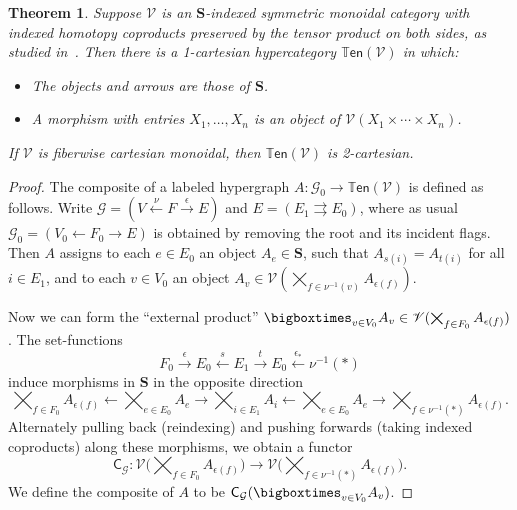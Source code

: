 \documentclass{article}
\newtheorem{thm}{Theorem}[section]
\theoremstyle{definition}
\theoremstyle{remark}
\def\G{\mathcal{G}}
\def\V{\mathscr{V}}
\def\ten{\mathbb{T}\mathsf{en}}
\let\ot\leftarrow
\let\xto\xrightarrow
\let\xot\xleftarrow
\def\bS{\ensuremath{\mathbf{S}}\xspace}
\begin{document}
\begin{thm}
  Suppose $\V$ is an \bS-indexed symmetric monoidal category with indexed homotopy coproducts preserved by the tensor product on both sides, as studied in~\cite{shulman:frbi,ps:indexed}.
  Then there is a 1-cartesian hypercategory $\ten(\V)$ in which:
  \begin{itemize}
  \item The objects and arrows are those of \bS.
  \item A morphism with entries $X_1,\dots,X_n$ is an object of $\V(X_1\times\cdots\times X_n)$.
  \end{itemize}
  If $\V$ is fiberwise cartesian monoidal, then $\ten(\V)$ is 2-cartesian.
\end{thm}
\begin{proof}
  The composite of a labeled hypergraph $A:\G_0\to\ten(\V)$ is defined as follows.
  Write $\G= (V\xot{\nu} F\xto{\epsilon} E)$ and $E = (E_1 \rightrightarrows E_0)$, where as usual $\G_0 = (V_0 \ot F_0 \to E)$ is obtained by removing the root and its incident flags.
  Then $A$ assigns to each $e\in E_0$ an object $A_e\in \bS$, such that $A_{s(i)}=A_{t(i)}$ for all $i\in E_1$, and to each $v\in V_0$ an object $A_v \in \V(\bigtimes_{f\in \nu^{-1}(v)} A_{\epsilon(f)})$.

  Now we can form the ``external product'' $\bigboxtimes_{v\in V_0} A_v \in \V(\bigtimes_{f\in F_0} A_{\epsilon(f)})$.
  The set-functions
  \[ F_0 \xto{\epsilon} E_0 \xot{s} E_1 \xto{t} E_0 \xot{\epsilon_\ast} \nu^{-1}(\ast) \]
  induce morphisms in \bS in the opposite direction
  \[ \bigtimes_{f\in F_0} A_{\epsilon(f)} \ot \bigtimes_{e\in E_0} A_e \to \bigtimes_{i\in E_1} A_{i} \ot \bigtimes_{e\in E_0} A_e \to \bigtimes_{f\in \nu^{-1}(\ast)} A_{\epsilon(f)}. \]
  Alternately pulling back (reindexing) and pushing forwards (taking indexed coproducts) along these morphisms, we obtain a functor
  \[ \mathsf{C}_\G : \V\Big(\bigtimes_{f\in F_0} A_{\epsilon(f)}\Big) \to \V\Big(\bigtimes_{f\in \nu^{-1}(\ast)} A_{\epsilon(f)}\Big). \]
  We define the composite of $A$ to be $\mathsf{C}_\G(\bigboxtimes_{v\in V_0} A_v)$.


\end{proof}
\end{document}
